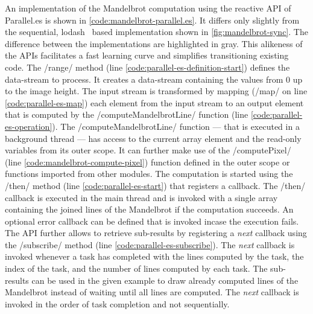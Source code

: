  An implementation of the Mandelbrot computation using the reactive API of Parallel.es is shown in \cref{code:mandelbrot-parallel.es}. It differs only slightly from the sequential, lodash~\cite{lodash} based implementation shown in \cref{fig:mandelbrot-sync}. The difference between the implementations are highlighted in gray. This alikeness of the APIs facilitates a fast learning curve and simplifies transitioning existing code. The \javascriptinline/range/ method (line \ref{code:parallel-es-definition-start}) defines the data-stream to process. It creates a data-stream containing the values from 0 up to the image height. The input stream is transformed by mapping (\javascriptinline/map/ on line \ref{code:parallel-es-map}) each element from the input stream to an output element that is computed by the \javascriptinline/computeMandelbrotLine/ function (line \ref{code:parallel-es-operation}). The \javascriptinline/computeMandelbrotLine/ function --- that is executed in a background thread --- has access to the current array element and the read-only variables from its outer scope. It can further make use of the \javascriptinline/computePixel/ (line \ref{code:mandelbrot-compute-pixel}) function defined in the outer scope or functions imported from other modules. The computation is started using the \javascriptinline/then/ method (line \ref{code:parallel-es-start}) that registers a callback. The \javascriptinline/then/ callback is executed in the main thread and is invoked with a single array containing the joined lines of the Mandelbrot if the computation succeeds. An optional error callback can be defined that is invoked incase the execution fails. The API further allows to retrieve sub-results by registering a \textit{next} callback using the \javascriptinline/subscribe/ method (line \ref{code:parallel-es-subscribe}). The \textit{next} callback is invoked whenever a task has completed with the lines computed by the task, the index of the task, and the number of lines computed by each task. The sub-results can be used in the given example to draw already computed lines of the Mandelbrot instead of waiting until all lines are computed. The \textit{next} callback is invoked in the order of task completion and not sequentially. 
 
